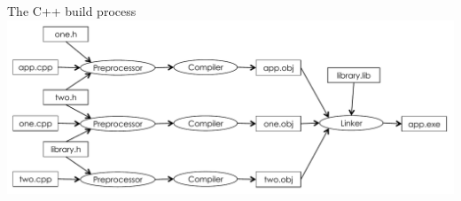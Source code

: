 \begin{frame}[fragile]{The C++ build process}
    \includegraphics[width=\textwidth]{compiler_flowchart.pdf}
\end{frame}
